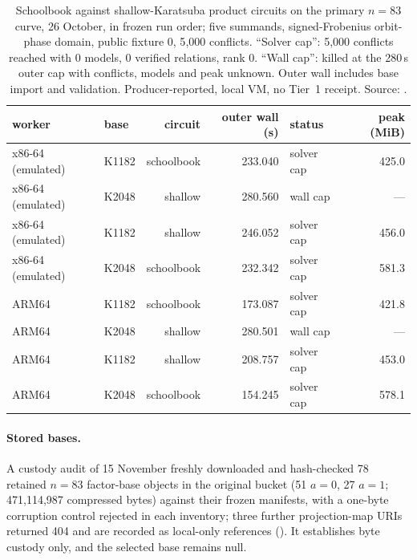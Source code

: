 \begin{table}[t]
\centering\small
\begin{tabular}{@{}llrrlr@{}}
\toprule
worker & base & circuit & outer wall (s) & status & peak (MiB) \\
\midrule
x86-64 (emulated) & K1182 & schoolbook & 233.040 & solver cap & 425.0 \\
x86-64 (emulated) & K2048 & shallow & 280.560 & wall cap & --- \\
x86-64 (emulated) & K1182 & shallow & 246.052 & solver cap & 456.0 \\
x86-64 (emulated) & K2048 & schoolbook & 232.342 & solver cap & 581.3 \\
ARM64 & K1182 & schoolbook & 173.087 & solver cap & 421.8 \\
ARM64 & K2048 & shallow & 280.501 & wall cap & --- \\
ARM64 & K1182 & shallow & 208.757 & solver cap & 453.0 \\
ARM64 & K2048 & schoolbook & 154.245 & solver cap & 578.1 \\
\bottomrule
\end{tabular}
\caption[]{Schoolbook against shallow-Karatsuba product circuits on the
primary $n=83$ curve, 26 October, in frozen run order; five summands,
signed-Frobenius orbit-phase domain, public fixture 0, 5{,}000 conflicts.
``Solver cap'': 5{,}000 conflicts reached with 0 models, 0 verified
relations, rank 0. ``Wall cap'': killed at the 280\,s outer cap with
conflicts, models and peak unknown. Outer wall includes base import and
validation. Producer-reported, local VM, no Tier~1 receipt. Source:
.}
\label{tab:n83l-circuits}
\end{table}

\paragraph{Stored bases.} A custody audit of 15 November freshly downloaded
and hash-checked 78 retained $n=83$ factor-base objects in the original
bucket (51 $a=0$, 27 $a=1$; 471{,}114{,}987 compressed bytes) against their
frozen manifests, with a one-byte corruption control rejected in each
inventory; three further projection-map URIs returned 404 and are recorded
as local-only references
().
It establishes byte custody only, and the selected base remains null.

